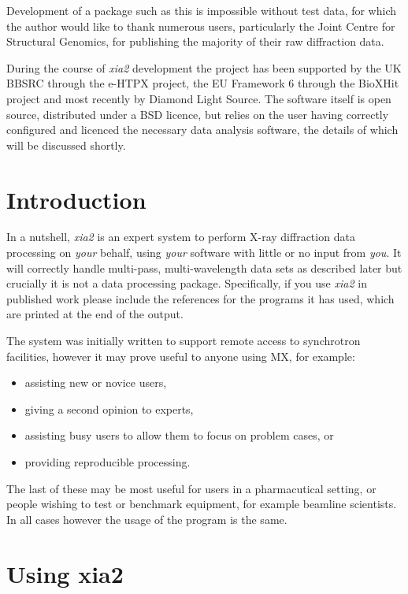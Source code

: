 \documentclass[a4paper, 11pt]{article}
\begin{document}
Development of a package such as this is impossible without test data, for
which the author would like to thank numerous users, particularly the 
Joint Centre for Structural Genomics, for publishing the majority of their
raw diffraction data. 

During the course of \emph{xia2} development the project has been 
supported by the UK BBSRC through the e-HTPX project, the EU Framework 6
through the BioXHit project and most recently by Diamond Light Source.
The software itself is open source, distributed under a BSD licence, but 
relies on the user having correctly configured and licenced the necessary
data analysis software, the details of which will be discussed shortly.

\section{Introduction}

In a nutshell, \emph{xia2} is an expert system to perform X-ray diffraction
data processing on \emph{your} behalf, using \emph{your} software with little
or no input from \emph{you}. It will correctly handle multi-pass, 
multi-wavelength data sets as described later but crucially it is not a
data processing package. Specifically, if you use \emph{xia2} in published
work please include the references for the programs it has used, which are
printed at the end of the output.

The system was initially written to support remote access to synchrotron 
facilities, however it may prove useful to anyone using MX, for example:

\begin{itemize}
\item{assisting new or novice users,}
\item{giving a second opinion to experts,}
\item{assisting busy users to allow them to focus on problem cases, or}
\item{providing reproducible processing.}
\end{itemize}

\noindent
The last of these may be most useful for users in a pharmacutical setting,
or people wishing to test or benchmark equipment, for example beamline 
scientists. In all cases however the usage of the program is the same.

\section{Using xia2}
\end{document}
